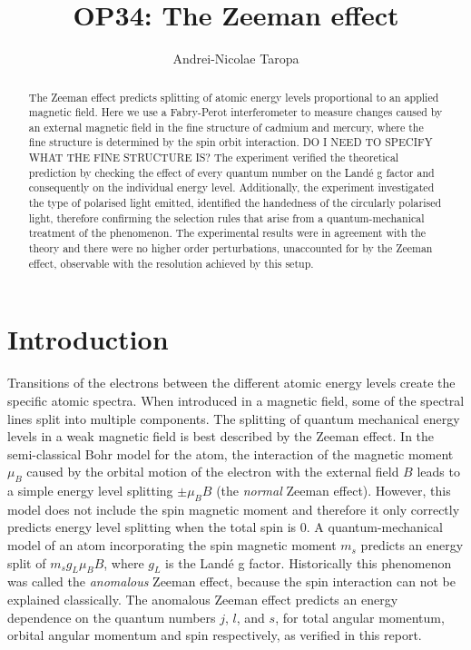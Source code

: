 \documentclass[11pt]{article}
\title{OP34: The Zeeman effect}
\author{Andrei-Nicolae Taropa}
\begin{document}
\maketitle


\begin{abstract}
The Zeeman effect predicts splitting of atomic energy levels proportional to an applied magnetic field. Here we use a Fabry-Perot interferometer to measure changes caused by an external magnetic field in the fine structure of cadmium and mercury, where the fine structure is determined by the spin orbit interaction. DO I NEED TO SPECIFY WHAT THE FINE STRUCTURE IS? The experiment verified the theoretical prediction by checking the effect of every quantum number on the Landé g factor and consequently on the individual energy level. Additionally, the experiment investigated the type of polarised light emitted, identified the handedness of the circularly polarised light, therefore confirming the selection rules that arise from a quantum-mechanical treatment of the phenomenon. The experimental results were in agreement with the theory and there were no higher order perturbations, unaccounted for by the Zeeman effect, observable with the resolution achieved by this setup. 
\end{abstract}


\section{Introduction}
Transitions of the electrons between the different atomic energy levels create the specific atomic spectra. When introduced in a magnetic field, some of the spectral lines split into multiple components. 
The splitting of quantum mechanical energy levels in a weak magnetic field is best described by the Zeeman effect. 
In the semi-classical Bohr model for the atom, the interaction of the magnetic moment $\mu_B$ caused by the orbital motion of the electron with the external field $B$ leads to a simple energy level splitting $\pm \mu_B B$ (the \emph{normal} Zeeman effect). 
However, this model does not include the spin magnetic moment and therefore it only correctly predicts energy level splitting when the total spin is $0$. A quantum-mechanical model of an atom incorporating the spin magnetic moment $m_s$ predicts an energy split of $m_s g_L \mu_B B$, where $g_L$ is the Landé g factor. Historically this phenomenon was called the \emph{anomalous} Zeeman effect, because the spin interaction can not be explained classically. The anomalous Zeeman effect predicts an energy dependence on the quantum numbers $j$, $l$, and $s$, for total angular momentum, orbital angular momentum and spin respectively, as verified in this report.
\end{document}
